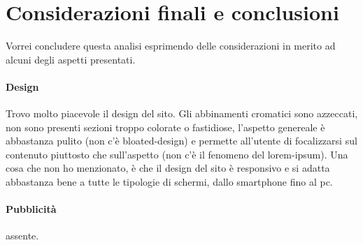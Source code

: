 \section{Considerazioni finali e conclusioni}
Vorrei concludere questa analisi esprimendo delle considerazioni in merito ad alcuni degli aspetti presentati.
\paragraph{Design} Trovo molto piacevole il design del sito. Gli abbinamenti cromatici sono azzeccati, non sono presenti sezioni troppo colorate o fastidiose, l'aspetto genereale è abbastanza pulito (non c'è bloated-design) e permette all'utente di focalizzarsi sul contenuto piuttosto che sull'aspetto (non c'è il fenomeno del lorem-ipsum). Una cosa che non ho menzionato, è che il design del sito è responsivo e si adatta abbastanza bene a tutte le tipologie di schermi, dallo smartphone fino al pc.
\paragraph{Pubblicità} assente.